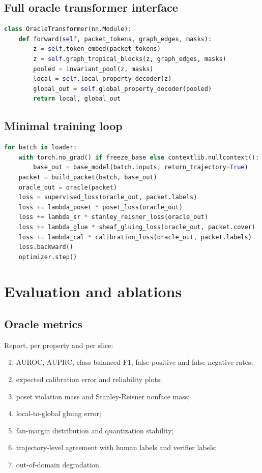 \documentclass[11pt]{article}
\numberwithin{equation}{section}
\begin{document}
\subsection{Full oracle transformer interface}
\begin{lstlisting}[language=Python]
class OracleTransformer(nn.Module):
    def forward(self, packet_tokens, graph_edges, masks):
        z = self.token_embed(packet_tokens)
        z = self.graph_tropical_blocks(z, graph_edges, masks)
        pooled = invariant_pool(z, masks)
        local = self.local_property_decoder(z)
        global_out = self.global_property_decoder(pooled)
        return local, global_out
\end{lstlisting}

\subsection{Minimal training loop}
\begin{lstlisting}[language=Python]
for batch in loader:
    with torch.no_grad() if freeze_base else contextlib.nullcontext():
        base_out = base_model(batch.inputs, return_trajectory=True)
    packet = build_packet(batch, base_out)
    oracle_out = oracle(packet)
    loss = supervised_loss(oracle_out, packet.labels)
    loss += lambda_poset * poset_loss(oracle_out)
    loss += lambda_sr * stanley_reisner_loss(oracle_out)
    loss += lambda_glue * sheaf_gluing_loss(oracle_out, packet.cover)
    loss += lambda_cal * calibration_loss(oracle_out, packet.labels)
    loss.backward()
    optimizer.step()
\end{lstlisting}

\section{Evaluation and ablations}
\subsection{Oracle metrics}
Report, per property and per slice:
\begin{enumerate}
\item AUROC, AUPRC, class-balanced F1, false-positive and false-negative rates;
\item expected calibration error and reliability plots;
\item poset violation mass and Stanley-Reisner nonface mass;
\item local-to-global gluing error;
\item fan-margin distribution and quantization stability;
\item trajectory-level agreement with human labels and verifier labels;
\item out-of-domain degradation.
\end{enumerate}
\end{document}
